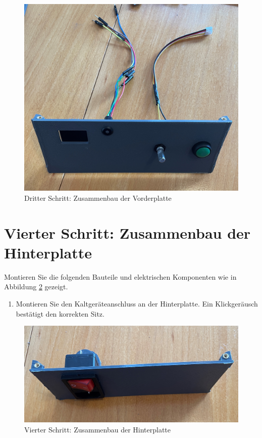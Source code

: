 \begin{figure}[H]
	\begin{center}
		\includegraphics[width=\textwidth]{Images/3Schr.jpg}
		\caption{Dritter Schritt: Zusammenbau der Vorderplatte} \label{3.S}
	\end{center}
\end{figure}


\section{Vierter Schritt: Zusammenbau der Hinterplatte}
Montieren Sie die folgenden Bauteile und elektrischen Komponenten wie in Abbildung \ref{4.S} gezeigt. 

\begin{enumerate}
	\item Montieren Sie den Kaltgeräteanschluss an der Hinterplatte. Ein Klickgeräusch bestätigt den korrekten Sitz.
\end{enumerate}

\begin{figure}[H]
	\begin{center}
		\includegraphics[width=\textwidth]{Images/4Schr.jpg}
		\caption{Vierter Schritt: Zusammenbau der Hinterplatte} \label{4.S}
	\end{center}
\end{figure}


